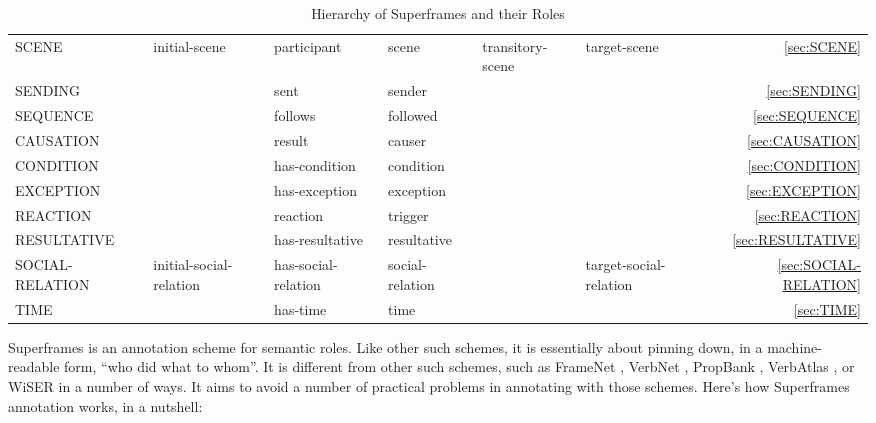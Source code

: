 \documentclass[a4paper]{article}
\newcommand{\fr}[1]{\textsf{#1}}
\newcommand{\rl}[1]{\textsf{#1}}
\newcommand{\Sub}{\textnoto{└} }
\newcommand{\SubSub}{\textcolor{white}{\Sub}\Sub}
\newcommand{\SubSubSub}{\textcolor{white}{\Sub}\SubSub}
\begin{document}
\begin{table}
{\begin{NiceTabular}{llllllr}
            \SubSub{} \fr{SCENE} & \rl{initial-scene} & \rl{participant} & \rl{scene} & \rl{transitory-scene} & \rl{target-scene} & \ref{sec:SCENE} \\

            \SubSub{} \fr{SENDING} & & \rl{sent} & \rl{sender} & & & \ref{sec:SENDING} \\

            \SubSub{} \fr{SEQUENCE} & & \rl{follows} & \rl{followed} & & & \ref{sec:SEQUENCE} \\
            \SubSubSub{} \fr{CAUSATION} & & \rl{result} & \rl{causer} & & & \ref{sec:CAUSATION} \\
            \SubSubSub{} \fr{CONDITION} & & \rl{has-condition} & \rl{condition} & & & \ref{sec:CONDITION} \\
            \SubSubSub{} \fr{EXCEPTION} & & \rl{has-exception} & \rl{exception} & & & \ref{sec:EXCEPTION} \\
            \SubSubSub{} \fr{REACTION} & & \rl{reaction} & \rl{trigger} & & & \ref{sec:REACTION} \\
            \SubSubSub{} \fr{RESULTATIVE} & & \rl{has-resultative} & \rl{resultative} & & & \ref{sec:RESULTATIVE} \\

            \SubSub{} \fr{SOCIAL-RELATION} & \rl{initial-social-relation} & \rl{has-social-relation} & \rl{social-relation} & & \rl{target-social-relation} & \ref{sec:SOCIAL-RELATION} \\

            \SubSub{} \fr{TIME} & & \rl{has-time} & \rl{time} & & & \ref{sec:TIME} \\

            \bottomrule
        \end{NiceTabular}
    }
    \caption{Hierarchy of Superframes and their Roles}
    \label{tab:superframes}
\end{table}

Superframes is an annotation scheme for semantic roles. Like other such
schemes, it is essentially about pinning down, in a machine-readable form,
``who did what to whom''. It is different from other such schemes, such as
FrameNet \citep{baker-etal-1998-berkeley}, VerbNet
\citep{kipper-schuler-2005-verbnet}, PropBank
\citep{palmer-etal-2005-proposition}, VerbAtlas
\citep{di-fabio-etal-2019-verbatlas}, or WiSER \citep{feng-etal-2022-widely} in
a number of ways. It aims to avoid a number of practical problems in annotating
with those schemes. Here's how Superframes annotation works, in a nutshell:
\end{document}
